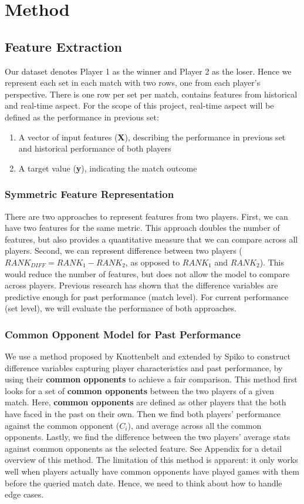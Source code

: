 \documentclass[paper=a4, fontsize=11pt]{scrartcl} %
\numberwithin{equation}{section} %
\numberwithin{figure}{section} %
\numberwithin{table}{section} %
\begin{document}
\section{Method}
\subsection{Feature Extraction}
\label{sec:label}
Our dataset denotes Player 1 as the winner and Player 2 as the loser.  Hence we represent each set in each match with two rows, one from each player's perspective.  There is one row per set per match, contains features from historical and real-time aspect.  For the scope of this project, real-time aspect will be defined as the performance in previous set:
\begin{enumerate}
\item A vector of input features (\textbf{X}), describing the performance in previous set and historical performance of both players
\item A target value (\textbf{y}), indicating the match outcome
\end{enumerate}
\subsubsection{Symmetric Feature Representation}
There are two approaches to represent features from two players.  First, we can have two features for the same metric.  This approach doubles the number of features, but also provides a quantitative measure that we can compare across all players.  Second, we can represent difference between two players ($RANK_{DIFF} = RANK_1 - RANK_2$, as opposed to $RANK_1$ and $RANK_2$).  This would reduce the number of features, but does not allow the model to compare across players.  Previous research has shown that the difference variables are predictive enough \cite{tennis1} \cite{omalley} for past performance (match level).  For current performance (set level), we will evaluate the performance of both approaches.  
\subsubsection{Common Opponent Model for Past Performance}
We use a method proposed by Knottenbelt \cite{KNOTTENBELT20123820} and extended by Spiko \cite{tennis1} to construct difference variables capturing player characteristics and past performance, by using their \textbf{common opponents} to achieve a fair comparison. 
This method first looks for a set of \textbf{common opponents} between the two players of a given match. Here, \textbf{common opponents} are defined as other players that the both have faced in the past on their own. Then we find both players' performance against the common opponent ($C_i$), and average across all the common opponents. Lastly, we find the difference between the two players' average stats against common opponents as the selected feature.  See Appendix for a detail overview of this method.
The limitation of this method is apparent: it only works well when players actually have common opponents have played games with them before the queried match date. Hence, we need to think about how to handle edge cases.
\end{document}
